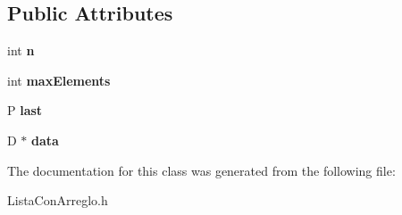\subsection*{Public Attributes}
\begin{DoxyCompactItemize}
\item 
int {\bfseries n}\label{class_lista_con_arreglo_a6873cb36ceda7890c9a6ec8be4c98a7b}

\item 
int {\bfseries max\-Elements}\label{class_lista_con_arreglo_ae2da0603009e9bcf6976df10a7608bb1}

\item 
P {\bfseries last}\label{class_lista_con_arreglo_ad912b66a410899c59a6496a48a610033}

\item 
D $\ast$ {\bfseries data}\label{class_lista_con_arreglo_a5d86fe7bb62b50bbf4a555e6fa78bcbe}

\end{DoxyCompactItemize}


The documentation for this class was generated from the following file\-:\begin{DoxyCompactItemize}
\item 
Lista\-Con\-Arreglo.\-h\end{DoxyCompactItemize}
